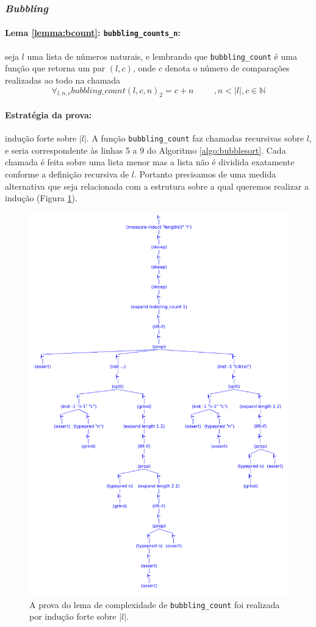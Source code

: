 \subsubsection{\textit{Bubbling}}

\paragraph{Lema \ref{lemma:bcount}: \texttt{bubbling\_counts\_n}:} seja $l$ uma lista de números naturais, e lembrando
que \texttt{bubbling\_count} é uma função que retorna um par $(l,c)$, onde $c$ denota o número
de comparações realizadas ao todo na chamada
\begin{equation*}
    \forall_{l,n,c} bubbling\_count(l, c, n)_2 = c + n \hspace{1cm}, n<|l|, c\in \mathbb{N}
\end{equation*}

\paragraph{Estratégia da prova:} indução forte sobre $|l|$.
A função \texttt{bubbling\_count} faz chamadas recursivas sobre $l$, e seria
correspondente às linhas 5 a 9 do Algoritmo \ref{algo:bubblesort}.
Cada chamada é feita sobre uma lista menor mas a lista não é dividida
exatamente conforme a definição recursiva de $l$. Portanto precisamos de
uma medida alternativa que seja relacionada com a estrutura
sobre a qual queremos realizar a indução (Figura \ref{fig:bubbling1}).

\begin{figure}[h!]
    \centering
    \includegraphics[width=0.5\linewidth,trim={8cm 35cm 8cm 0},clip]{figures/bubbling-counts-n.png}
    \caption{A prova do lema de complexidade de \texttt{bubbling\_count} foi realizada
    por indução forte sobre $|l|$.}
    \label{fig:bubbling1}
\end{figure}

